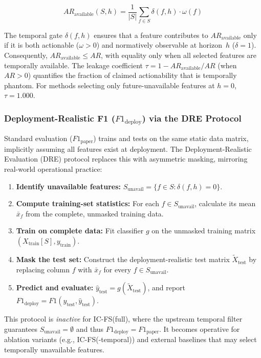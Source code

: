 \documentclass[a4paper,fleqn]{cas-sc}
\begin{document}
\begin{equation}
    AR_{\text{available}}(S, h) = \frac{1}{|S|} \sum_{f \in S} \delta(f, h) \cdot \omega(f)
\end{equation}

The temporal gate $\delta(f, h)$ ensures that a feature contributes to $AR_{\text{available}}$ only if it is both actionable ($\omega>0$) and normatively observable at horizon~$h$ ($\delta=1$). Consequently, $AR_{\text{available}} \le AR$, with equality only when all selected features are temporally available. The leakage coefficient $\tau = 1 - AR_{\text{available}} / AR$ (when $AR > 0$) quantifies the fraction of claimed actionability that is temporally phantom. For methods selecting only future-unavailable features at $h=0$, $\tau = 1.000$.

\subsubsection{Deployment-Realistic F1 ($F1_{\text{deploy}}$) via the DRE Protocol}
Standard evaluation ($F1_{\text{paper}}$) trains and tests on the same static data matrix, implicitly assuming all features exist at deployment. The Deployment-Realistic Evaluation (DRE) protocol replaces this with asymmetric masking, mirroring real-world operational practice:

\begin{enumerate}
    \item \textbf{Identify unavailable features:} $S_{\text{unavail}} = \{f \in S : \delta(f, h) = 0\}$.
    \item \textbf{Compute training-set statistics:} For each $f \in S_{\text{unavail}}$, calculate its mean $\bar{x}_f$ from the complete, unmasked training data.
    \item \textbf{Train on complete data:} Fit classifier $g$ on the unmasked training matrix $(X_{\text{train}}[S], y_{\text{train}})$.
    \item \textbf{Mask the test set:} Construct the deployment-realistic test matrix $\tilde{X}_{\text{test}}$ by replacing column $f$ with $\bar{x}_f$ for every $f \in S_{\text{unavail}}$.
    \item \textbf{Predict and evaluate:} $\hat{y}_{\text{test}} = g(\tilde{X}_{\text{test}})$, and report $F1_{\text{deploy}} = F1(y_{\text{test}}, \hat{y}_{\text{test}})$.
\end{enumerate}

This protocol is \emph{inactive} for IC-FS(full), where the upstream temporal filter guarantees $S_{\text{unavail}} = \emptyset$ and thus $F1_{\text{deploy}} = F1_{\text{paper}}$. It becomes operative for ablation variants (e.g., IC-FS(-temporal)) and external baselines that may select temporally unavailable features.
\end{document}
